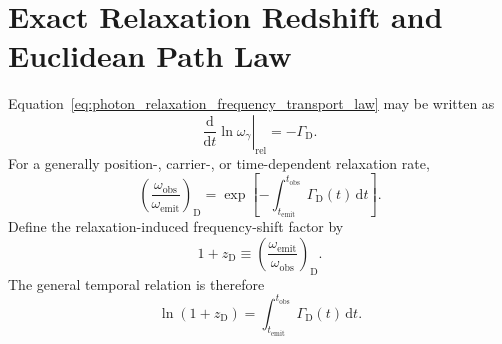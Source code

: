 \section{Exact Relaxation Redshift and Euclidean Path Law}
\label{sec:photon_relaxation_exact_redshift}

Equation~\eqref{eq:photon_relaxation_frequency_transport_law} may be written
as
\begin{equation}
    \left.
    \frac{\mathrm d}{\mathrm dt}
    \ln\omega_\gamma
    \right|_{\mathrm{rel}}
    =
    -\Gamma_{\mathrm D}.
    \label{eq:photon_relaxation_log_frequency_transport}
\end{equation}
For a generally position-, carrier-, or time-dependent relaxation rate,
\begin{equation}
    \left(
        \frac{
            \omega_{\mathrm{obs}}
        }{
            \omega_{\mathrm{emit}}
        }
    \right)_{\mathrm D}
    =
    \exp
    \left[
        -
        \int_{t_{\mathrm{emit}}}^{t_{\mathrm{obs}}}
        \Gamma_{\mathrm D}(t)
        \,\mathrm dt
    \right].
    \label{eq:photon_relaxation_frequency_ratio}
\end{equation}
Define the relaxation-induced frequency-shift factor by
\begin{equation}
    1+z_{\mathrm D}
    \equiv
    \left(
        \frac{
            \omega_{\mathrm{emit}}
        }{
            \omega_{\mathrm{obs}}
        }
    \right)_{\mathrm D}.
    \label{eq:photon_relaxation_redshift_definition}
\end{equation}
The general temporal relation is therefore
\begin{equation}
    \boxed{
    \ln
    \left(
        1+z_{\mathrm D}
    \right)
    =
    \int_{t_{\mathrm{emit}}}^{t_{\mathrm{obs}}}
    \Gamma_{\mathrm D}(t)
    \,\mathrm dt.
    }
    \label{eq:photon_relaxation_exact_time_redshift}
\end{equation}

